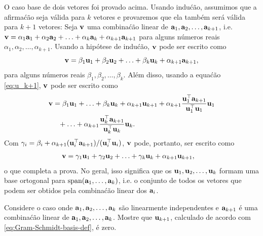 \begin{exenumerate}
    \begin{solution} O caso base de dois vetores foi provado acima. Usando
        indu\'c\~ao, assumimos que a afirma\'c\~ao seja v\'alida para $k$ vetores e provaremos que
        ela tamb\'em ser\'a v\'alida para $k + 1$ vetores: Seja $\mathbf{v}$ uma combina\'c\~ao linear de
        $\mathbf{a}_1, \mathbf{a}_2, \ldots,
        \mathbf{a}_{k+1}$, i.e. $\mathbf{v} = \alpha_1\mathbf{a}_1 + \alpha_2\mathbf{a}_2 + \ldots + \alpha_k\mathbf{a}_k +
        \alpha_{k+1}\mathbf{a}_{k+1}$ para alguns n\'umeros reais $\alpha_1, \alpha_2, \ldots,
        \alpha_{k+1}$. Usando a hip\'otese de indu\'c\~ao, $\mathbf{v}$ pode ser escrito como
        \begin{equation}
            \mathbf{v} = \beta_1\mathbf{u}_1 + \beta_2\mathbf{u}_2 + \ldots + \beta_k\mathbf{u}_k + \alpha_{k+1}\mathbf{a}_{k+1},
        \end{equation}
        para alguns n\'umeros reais $\beta_1, \beta_2, \ldots, \beta_k$. Al\'em disso, usando a equa\'c\~ao \eqref{eq:u_k+1}, $\mathbf{v}$ pode ser escrito como
        \begin{align}
            \mathbf{v} &= \beta_1\mathbf{u}_1  + \ldots + \beta_k\mathbf{u}_k + \alpha_{k+1}\mathbf{u}_{k+1} + \alpha_{k+1}\frac{\mathbf{u}_1^\top\mathbf{a}_{k+1}}{\mathbf{u}_1^\top\mathbf{u}_1}\mathbf{u}_1 \\ 
            &\phantom{=}+ \ldots + \alpha_{k+1}\frac{\mathbf{u}_k^\top\mathbf{a}_{k+1}}{\mathbf{u}_k^\top\mathbf{u}_k}\mathbf{u}_k.
        \end{align}
        Com $\gamma_i = \beta_i + \alpha_{k+1}(\mathbf{u}_i^\top\mathbf{a}_{k+1})/(\mathbf{u}_i^\top\mathbf{u}_i)$, $\mathbf{v}$ pode, portanto, ser escrito como
        \begin{align}
            \mathbf{v} &= \gamma_1\mathbf{u}_1 + \gamma_2\mathbf{u}_2 + \ldots + \gamma_k\mathbf{u}_k + \alpha_{k+1}\mathbf{u}_{k+1},
        \end{align}
        o que completa a prova. No geral, isso significa que os $\mathbf{u}_1, \mathbf{u}_2, \ldots,
        \mathbf{u}_k$ formam uma base ortogonal para $\text{span}(\mathbf{a}_1, \ldots, \mathbf{a}_k)$, i.e.
        o conjunto de todos os vetores que podem ser obtidos pela combina\'c\~ao linear dos
        $\mathbf{a}_i$.
        
    \end{solution}
    
    \item Considere o caso onde $\mathbf{a}_1, \mathbf{a}_2, \ldots, \mathbf{a}_k$ s\~ao linearmente
    independentes e $\mathbf{a}_{k+1}$ \'e uma combina\'c\~ao linear de $\mathbf{a}_1, \mathbf{a}_2, \ldots,
    \mathbf{a}_k$. Mostre que $\mathbf{u}_{k+1}$, calculado de acordo com
    \eqref{eq:Gram-Schmidt-basis-def}, \'e zero.
    

\end{exenumerate}
